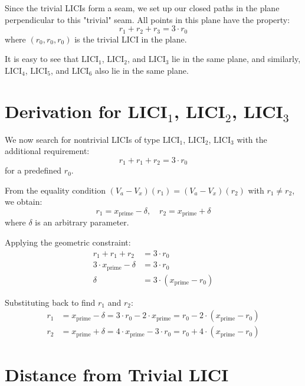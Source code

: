 \documentclass{article}
\begin{document}
Since the trivial LICIs form a seam, we set up our closed paths in the plane perpendicular to this "trivial" seam. All points in this plane have the property:
\begin{equation}
r_1 + r_2 + r_3 = 3 \cdot r_0
\end{equation}
where $(r_0, r_0, r_0)$ is the trivial LICI in the plane.

It is easy to see that $\text{LICI}_1$, $\text{LICI}_2$, and $\text{LICI}_3$ lie in the same plane, and similarly, $\text{LICI}_4$, $\text{LICI}_5$, and $\text{LICI}_6$ also lie in the same plane.

\section{Derivation for LICI$_1$, LICI$_2$, LICI$_3$}

We now search for nontrivial LICIs of type $\text{LICI}_1$, $\text{LICI}_2$, $\text{LICI}_3$ with the additional requirement:
\begin{equation}
r_1 + r_1 + r_2 = 3 \cdot r_0
\end{equation}
for a predefined $r_0$.

From the equality condition $(V_a - V_x)(r_1) = (V_a - V_x)(r_2)$ with $r_1 \neq r_2$, we obtain:
\begin{equation}
r_1 = x_{\text{prime}} - \delta, \quad r_2 = x_{\text{prime}} + \delta
\end{equation}
where $\delta$ is an arbitrary parameter.

Applying the geometric constraint:
\begin{align}
r_1 + r_1 + r_2 &= 3 \cdot r_0 \\
3 \cdot x_{\text{prime}} - \delta &= 3 \cdot r_0 \\
\delta &= 3 \cdot (x_{\text{prime}} - r_0)
\end{align}

Substituting back to find $r_1$ and $r_2$:
\begin{align}
r_1 &= x_{\text{prime}} - \delta = 3 \cdot r_0 - 2 \cdot x_{\text{prime}} = r_0 - 2 \cdot (x_{\text{prime}} - r_0) \\
r_2 &= x_{\text{prime}} + \delta = 4 \cdot x_{\text{prime}} - 3 \cdot r_0 = r_0 + 4 \cdot (x_{\text{prime}} - r_0)
\end{align}

\section{Distance from Trivial LICI}
\end{document}
